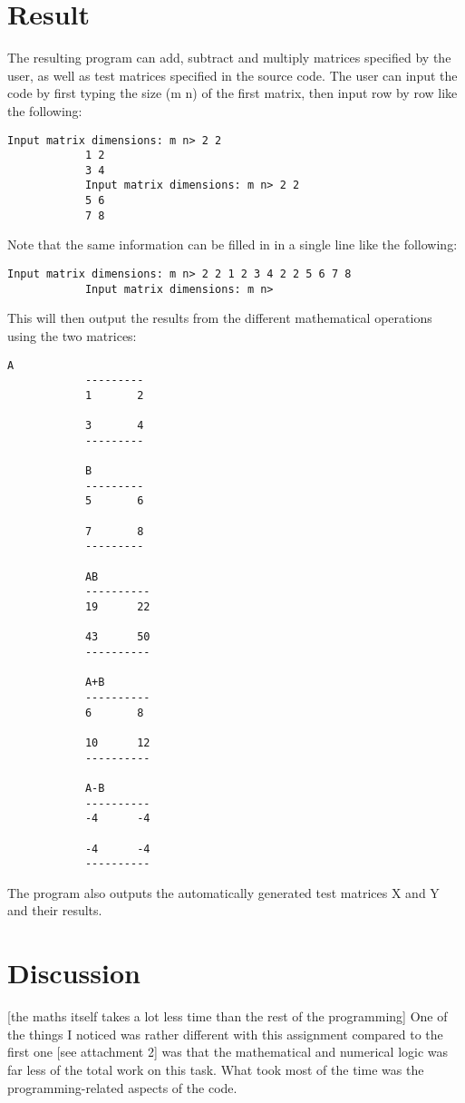 \documentclass{article}
\begin{document}
	\section{Result}
		The resulting program can add, subtract and multiply matrices specified by the user, as well as test matrices specified in the source code.
		The user can input the code by first typing the size (m n) of the first matrix, then input row by row like the following:
		\begin{lstlisting}[style=console]
			Input matrix dimensions: m n> 2 2
			1 2
			3 4
			Input matrix dimensions: m n> 2 2
			5 6
			7 8
		\end{lstlisting}
		Note that the same information can be filled in in a single line like the following:
		\begin{lstlisting}[style=console]
			Input matrix dimensions: m n> 2 2 1 2 3 4 2 2 5 6 7 8
			Input matrix dimensions: m n>
		\end{lstlisting}
		This will then output the results from the different mathematical operations using the two matrices:
		\begin{lstlisting}[style=console]
			A
			---------
			1       2
			
			3       4
			---------
			
			B
			---------
			5       6
			
			7       8
			---------
			
			AB
			----------
			19      22
			
			43      50
			----------
			
			A+B
			----------
			6       8
			
			10      12
			----------
			
			A-B
			----------
			-4      -4
			
			-4      -4
			----------
		\end{lstlisting}
		The program also outputs the automatically generated test matrices X and Y and their results.
	
	
	\section{Discussion}
		[the maths itself takes a lot less time than the rest of the programming]
		One of the things I noticed was rather different with this assignment compared to the first one
		[see attachment 2]
		was that the mathematical and numerical logic was far less of the total work on this task.
		What took most of the time was the programming-related aspects of the code.
	
\end{document}
